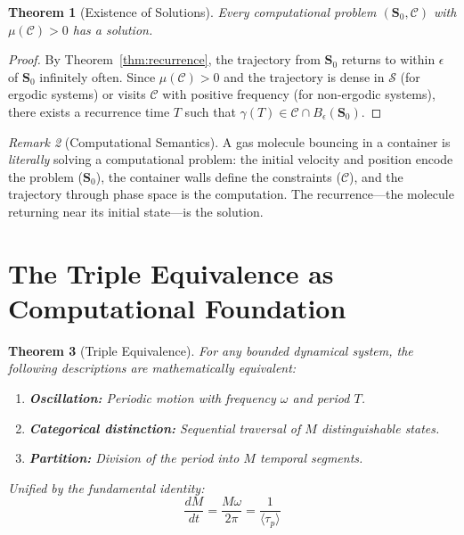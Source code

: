 \documentclass[twocolumn,10pt,a4paper]{article}
\theoremstyle{plain}
\newtheorem{theorem}{Theorem}[section]
\theoremstyle{definition}
\theoremstyle{remark}
\newtheorem{remark}[theorem]{Remark}
\newcommand{\Sspace}{\mathcal{S}}
\newcommand{\Scoord}{\mathbf{S}}
\newcommand{\trajectory}{\gamma}
\newcommand{\taup}{\tau_p}
\begin{document}
\begin{theorem}[Existence of Solutions]
\label{thm:existence}
Every computational problem $(\Scoord_0, \mathcal{C})$ with $\mu(\mathcal{C}) > 0$ has a solution.
\end{theorem}

\begin{proof}
By Theorem~\ref{thm:recurrence}, the trajectory from $\Scoord_0$ returns to within $\epsilon$ of $\Scoord_0$ infinitely often. Since $\mu(\mathcal{C}) > 0$ and the trajectory is dense in $\Sspace$ (for ergodic systems) or visits $\mathcal{C}$ with positive frequency (for non-ergodic systems), there exists a recurrence time $T$ such that $\trajectory(T) \in \mathcal{C} \cap B_\epsilon(\Scoord_0)$.
\end{proof}

\begin{remark}[Computational Semantics]
A gas molecule bouncing in a container is \emph{literally} solving a computational problem: the initial velocity and position encode the problem ($\Scoord_0$), the container walls define the constraints ($\mathcal{C}$), and the trajectory through phase space is the computation. The recurrence---the molecule returning near its initial state---is the solution.
\end{remark}

\section{The Triple Equivalence as Computational Foundation}
\label{sec:triple_equiv}

\begin{theorem}[Triple Equivalence]
\label{thm:triple}
For any bounded dynamical system, the following descriptions are mathematically equivalent:
\begin{enumerate}
    \item \textbf{Oscillation:} Periodic motion with frequency $\omega$ and period $T$.
    \item \textbf{Categorical distinction:} Sequential traversal of $M$ distinguishable states.
    \item \textbf{Partition:} Division of the period into $M$ temporal segments.
\end{enumerate}
Unified by the fundamental identity:
\begin{equation}
\label{eq:fund_id}
    \frac{dM}{dt} = \frac{M\omega}{2\pi} = \frac{1}{\langle\taup\rangle}
\end{equation}
\end{theorem}
\end{document}
